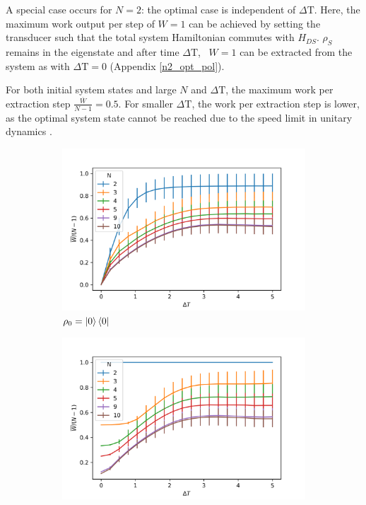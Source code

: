 A special case occurs for $N = 2$: the optimal case is independent of $\Delta \mathrm{T}$.
Here, the maximum work output per step of $W = 1$ can be achieved by setting the transducer such that the total system Hamiltonian commutes with $H_{DS}$. $\rho_S$ remains in the eigenstate and after time $\Delta \mathrm{T}$, \ $W = 1$ can be extracted from the system as with $\Delta \mathrm{T} = 0$ (Appendix \ref{n2_opt_pol}).

For both initial system states and large $N$ and $\Delta \mathrm{T}$, the maximum work per extraction step $\frac{\overline{W}}{N-1} = 0.5$.
For smaller $\Delta \mathrm{T}$, the work per extraction step is lower, as the optimal system state cannot be reached due to the speed limit in unitary dynamics \cite{Deffner_2017, PhysRevA.67.052109}.

\begin{figure}[h]
	\centering
	\begin{subfigure}{0.4\textwidth}
		\centering
		\includegraphics[width=\textwidth]{img/dt_0}
		\caption{$\rho_0 = \ket{0}\bra{0}$}
		\label{dt_0}
	\end{subfigure}
	\begin{subfigure}{0.4\textwidth}
	\centering
	\includegraphics[width=\textwidth]{img/dt_eigen}

\end{subfigure}
\end{figure}
